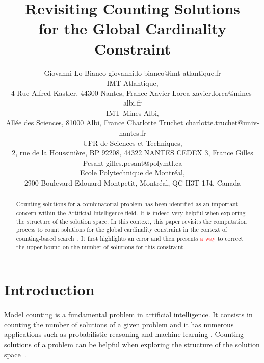 \documentclass[jair,twoside,11pt,theapa]{article}
\newcommand{\major}[1]{\textcolor{red}{#1}}
\begin{document}
\title{Revisiting Counting Solutions \\ for the Global Cardinality Constraint}

\author{\name Giovanni Lo Bianco \email giovanni.lo-bianco@imt-atlantique.fr \\
       \addr IMT Atlantique, \\
       4 Rue Alfred Kastler, 44300 Nantes, France
       \AND
       \name Xavier Lorca \email xavier.lorca@mines-albi.fr \\
       \addr IMT Mines Albi, \\
       All\'ee des Sciences, 81000 Albi, France 
       \AND
       \name Charlotte Truchet \email charlotte.truchet@univ-nantes.fr \\
       \addr UFR de Sciences et Techniques, \\
		2, rue de la Houssini\`ere, BP 92208, 44322 NANTES CEDEX 3, France 
       \AND
       \name Gilles Pesant \email gilles.pesant@polymtl.ca \\
       \addr Ecole Polytechnique de Montr\'eal, \\
       2900 Boulevard Edouard-Montpetit, Montr\'eal, QC H3T 1J4, Canada \\
       }


\maketitle


\begin{abstract}
Counting solutions for a combinatorial problem has been identified as an important concern within the Artificial Intelligence field. It is indeed very helpful when exploring the structure of the solution space. In this context, this paper revisits the computation process to count solutions for the global cardinality constraint in the context of counting-based search~\cite{PesantQZ12}. It first highlights an error and then presents \major{a way} to correct the upper bound on the number of solutions for this constraint.
\end{abstract}

\section{Introduction}
\label{Introduction}

\paragraph{}
Model counting is a fundamental problem in artificial intelligence. It consists in counting the number of solutions of a given problem and it has numerous applications such as probabilistic reasoning and machine learning \cite{GomesHSS07,DBLP:journals/corr/MeelVCFSFIM15}. 
Counting solutions of a problem can be helpful when exploring the structure of the solution space~\cite{AI09}.
\end{document}
